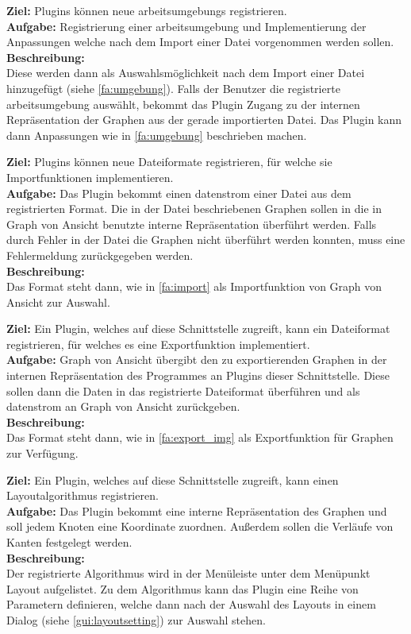 \label{s:umgebung}
\textbf{Ziel:} Plugins können neue \glspl{arbeitsumgebung} registrieren.\\
\textbf{Aufgabe:}
Registrierung einer \gls{arbeitsumgebung} und Implementierung der Anpassungen welche nach dem Import einer Datei vorgenommen werden sollen.\\
\textbf{Beschreibung:}\\
Diese werden dann als Auswahlsmöglichkeit nach dem Import einer Datei hinzugefügt (siehe \ref{fa:umgebung}).
Falls der Benutzer die registrierte \gls{arbeitsumgebung} auswählt, bekommt das Plugin Zugang zu der internen Repräsentation der Graphen aus der gerade importierten Datei. Das Plugin kann dann Anpassungen wie in \ref{fa:umgebung} beschrieben machen.

\label{s:import}
\textbf{Ziel:} Plugins können neue Dateiformate registrieren, für welche sie Importfunktionen implementieren.\\
\textbf{Aufgabe:}
Das Plugin bekommt einen \gls{datenstrom} einer Datei aus dem registrierten Format. Die in der Datei beschriebenen Graphen sollen in die in Graph von Ansicht benutzte interne Repräsentation überführt werden. Falls durch Fehler in der Datei die Graphen nicht überführt werden konnten, muss eine Fehlermeldung zurückgegeben werden.\\
\textbf{Beschreibung:}\\
Das Format steht dann, wie in \ref{fa:import} als Importfunktion von Graph von Ansicht zur Auswahl.

\label{s:export}
\textbf{Ziel:} Ein Plugin, welches auf diese Schnittstelle zugreift, kann ein Dateiformat registrieren, für welches es eine Exportfunktion implementiert.\\
\textbf{Aufgabe:}
Graph von Ansicht übergibt den zu exportierenden Graphen in der internen Repräsentation des Programmes an Plugins dieser Schnittstelle. Diese sollen dann die Daten in das registrierte Dateiformat überführen und als \gls{datenstrom} an Graph von Ansicht zurückgeben.\\
\textbf{Beschreibung:}\\
Das Format steht dann, wie in \ref{fa:export_img} als Exportfunktion für Graphen zur Verfügung.

\label{s:layoutalgo}
\textbf{Ziel:} Ein Plugin, welches auf diese Schnittstelle zugreift, kann einen Layoutalgorithmus registrieren.\\
\textbf{Aufgabe:}
Das Plugin bekommt eine interne Repräsentation des Graphen und soll jedem Knoten eine Koordinate zuordnen. Außerdem sollen die Verläufe von Kanten festgelegt werden.\\
\textbf{Beschreibung:}\\
Der registrierte Algorithmus wird in der Menüleiste unter dem Menüpunkt Layout aufgelistet.
Zu dem Algorithmus kann das Plugin eine Reihe von Parametern definieren, welche dann nach der Auswahl des Layouts in einem Dialog (siehe \ref{gui:layoutsetting}) zur Auswahl stehen.


